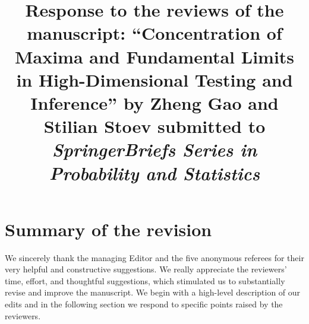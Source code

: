 \documentclass[11pt]{article}
\title{Response to the reviews of the manuscript: ``Concentration of Maxima and Fundamental Limits in High-Dimensional Testing and Inference'' by Zheng Gao
and Stilian Stoev submitted to {\em SpringerBriefs Series in Probability and Statistics} }
\begin{document}
 \maketitle
 
 \section*{Summary of the revision}
 
 We sincerely thank the managing Editor and the five anonymous referees for their very helpful and constructive suggestions.  We really 
 appreciate the reviewers' time, effort, and thoughtful suggestions, which stimulated us to substantially revise and improve the manuscript.
 We begin with a high-level description of our edits and in the following section we respond to specific points raised by the reviewers.
 
\end{document}
